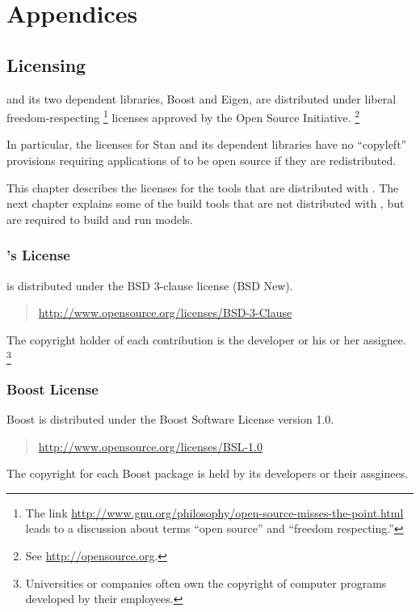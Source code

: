 \part*{Appendices}


\chapter{Licensing}\label{licensing.appendix}

\noindent
\Stan and its two dependent libraries, Boost and Eigen, are
distributed under liberal freedom-respecting%
%
\footnote{The link
  \url{http://www.gnu.org/philosophy/open-source-misses-the-point.html}
  leads to a discussion about terms ``open
  source'' and ``freedom respecting.''}
%
licenses approved by the Open Source Initiative.%
\footnote{See \url{http://opensource.org}.}  

In particular, the licenses for Stan and its dependent libraries have
no ``copyleft'' provisions requiring applications of \Stan to be
open source if they are redistributed.

This chapter describes the licenses for the tools that are distributed
with \Stan.  The next chapter explains some of the build tools that
are not distributed with \Stan, but are required to build and run
\Stan models.

\section{\Stan's License}

\Stan is distributed under the BSD 3-clause license (BSD New).
%
\begin{quote}
\url{http://www.opensource.org/licenses/BSD-3-Clause}
\end{quote}
%
The copyright holder of each contribution is the developer or his or
her assignee.%
%
\footnote{Universities or companies often own the copyright of
  computer programs developed by their employees.}


\section{Boost License}

Boost is distributed under the Boost Software
License version 1.0.
%
\begin{quote}
\url{http://www.opensource.org/licenses/BSL-1.0}
\end{quote}
%
The copyright for each Boost package is held by its developers or their
assginees.


